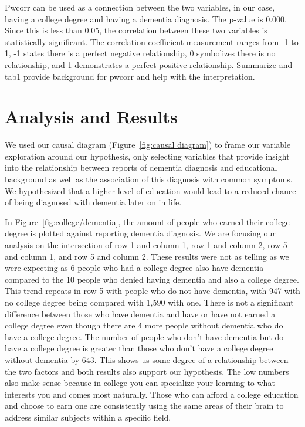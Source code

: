 \documentclass{article}
\begin{document}
 Pwcorr can be used as a connection between the two variables, in our case, having a college degree and having a dementia diagnosis. The p-value is 0.000. Since this is less than 0.05, the correlation between these two variables is statistically significant. The correlation coefficient measurement ranges from -1 to 1, -1 states there is a perfect negative relationship, 0 symbolizes there is no relationship, and 1 demonstrates a perfect positive relationship. Summarize and tab1 provide background for pwcorr and help with the interpretation. 

\section{Analysis and Results}
\label{sec:result}

\hspace*{1em} We used our causal diagram (Figure~\ref{fig:causal diagram}) to frame our variable exploration around our hypothesis, only selecting variables that provide insight into the relationship between reports of dementia diagnosis and educational background as well as the association of this diagnosis with common symptoms. We hypothesized that a higher level of education would lead to a reduced chance of being diagnosed with dementia later on in life.  

\hspace*{1em} In Figure~\ref{fig:college/dementia}, the amount of people who earned their college degree is plotted against reporting dementia diagnosis. We are focusing our analysis on the intersection of row 1 and column 1, row 1 and column 2, row 5 and column 1, and row 5 and column 2. These results were not as telling as we were expecting as 6 people who had a college degree also have dementia compared to the 10 people who denied having dementia and also a college degree. This trend repeats in row 5 with people who do not have dementia, with 947 with no college degree being compared with 1,590 with one. There is not a significant difference between those who have dementia and have or have not earned a college degree even though there are 4 more people without dementia who do have a college degree. The number of people who don’t have dementia but do have a college degree is greater than those who don’t have a college degree without dementia by 643. This shows us some degree of a relationship between the two factors and both results also support our hypothesis. The low numbers also make sense because in college you can specialize your learning to what interests you and comes most naturally. Those who can afford a college education and choose to earn one are consistently using the same areas of their brain to address similar subjects within a specific field. 
\end{document}
